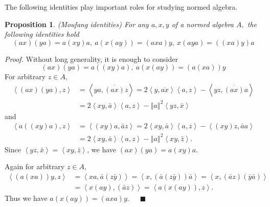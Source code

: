 \documentclass[a4paper]{article}%
\newtheorem{proposition}[theorem]{Proposition}
\newenvironment{proof}[1][Proof]{\noindent\textit{#1.} }{}
\begin{document}
The following identities play important roles for studying normed algebra.

\begin{proposition}
\label{MoufangPro}(Moufang identities) For any $a,x,y$ of a normed algebra
$A,$ the following identities hold
\[
\left(  ax\right)  \left(  ya\right)  =a\left(  xy\right)  a,\ a\left(
x\left(  ay\right)  \right)  =\left(  axa\right)  y,\ x\left(  aya\right)
=\left(  \left(  xa\right)  y\right)  a
\]

\end{proposition}

\begin{proof}
Without long generality, it is enough to consider
\[
\left(  ax\right)  \left(  ya\right)  =a\left(  \left(  xy\right)  a\right)
,\ a\left(  x\left(  ay\right)  \right)  =\left(  a\left(  xa\right)  \right)
y
\]
For arbitrary $z\in A$,%
\begin{align*}
\left\langle \left(  ax\right)  \left(  ya\right)  ,z\right\rangle  &
=\left\langle ya,\overline{\left(  ax\right)  }z\right\rangle =2\left\langle
y,\overline{ax}\right\rangle \left\langle a,z\right\rangle -\left\langle
yz,\overline{\left(  ax\right)  }a\right\rangle \\
&  =2\left\langle xy,\bar{a}\right\rangle \left\langle a,z\right\rangle
-\left\Vert a\right\Vert ^{2}\left\langle yz,\bar{x}\right\rangle
\end{align*}
and
\begin{align*}
\left\langle a\left(  \left(  xy\right)  a\right)  ,z\right\rangle  &
=\left\langle \left(  xy\right)  a,\bar{a}z\right\rangle =2\left\langle
xy,\bar{a}\right\rangle \left\langle a,z\right\rangle -\left\langle \left(
xy\right)  z,\bar{a}a\right\rangle \\
&  =2\left\langle xy,\bar{a}\right\rangle \left\langle a,z\right\rangle
-\left\Vert a\right\Vert ^{2}\left\langle xy,\bar{z}\right\rangle .
\end{align*}
Since $\left\langle yz,\bar{x}\right\rangle =\left\langle xy,\bar
{z}\right\rangle $, we have $\left(  ax\right)  \left(  ya\right)  =a\left(
xy\right)  a$.

Again for arbitrary $z\in A$,
\begin{align*}
\left\langle \left(  a\left(  xa\right)  \right)  y,z\right\rangle  &
=\left\langle xa,\bar{a}\left(  z\bar{y}\right)  \right\rangle =\left\langle
x,\left(  \bar{a}\left(  z\bar{y}\right)  \right)  \bar{a}\right\rangle
=\left\langle x,\left(  \bar{a}z\right)  \left(  \bar{y}\bar{a}\right)
\right\rangle \\
&  =\left\langle x\left(  ay\right)  ,\left(  \bar{a}z\right)  \right\rangle
=\left\langle a\left(  x\left(  ay\right)  \right)  ,z\right\rangle .
\end{align*}
Thus we have $a\left(  x\left(  ay\right)  \right)  =\left(  axa\right)
y$.\ \ \ $\blacksquare$
\end{proof}
\end{document}
